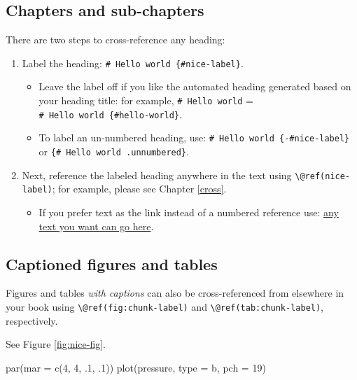 \documentclass[
]{book}
\newenvironment{Shaded}{\begin{snugshade}}{\end{snugshade}}
\newcommand{\AttributeTok}[1]{\textcolor[rgb]{0.77,0.63,0.00}{#1}}
\newcommand{\DecValTok}[1]{\textcolor[rgb]{0.00,0.00,0.81}{#1}}
\newcommand{\FunctionTok}[1]{\textcolor[rgb]{0.00,0.00,0.00}{#1}}
\newcommand{\NormalTok}[1]{#1}
\newcommand{\StringTok}[1]{\textcolor[rgb]{0.31,0.60,0.02}{#1}}
\providecommand{\tightlist}{%
  \setlength{\itemsep}{0pt}\setlength{\parskip}{0pt}}
\theoremstyle{definition}
\theoremstyle{definition}
\theoremstyle{definition}
\theoremstyle{definition}
\theoremstyle{remark}
\begin{document}
\hypertarget{chapters-and-sub-chapters}{%
\subsection{Chapters and sub-chapters}\label{chapters-and-sub-chapters}}

There are two steps to cross-reference any heading:

\begin{enumerate}
\def\labelenumi{\arabic{enumi}.}
\tightlist
\item
  Label the heading: \texttt{\#\ Hello\ world\ \{\#nice-label\}}.

  \begin{itemize}
  \tightlist
  \item
    Leave the label off if you like the automated heading generated based on your heading title: for example, \texttt{\#\ Hello\ world} = \texttt{\#\ Hello\ world\ \{\#hello-world\}}.
  \item
    To label an un-numbered heading, use: \texttt{\#\ Hello\ world\ \{-\#nice-label\}} or \texttt{\{\#\ Hello\ world\ .unnumbered\}}.
  \end{itemize}
\item
  Next, reference the labeled heading anywhere in the text using \texttt{\textbackslash{}@ref(nice-label)}; for example, please see Chapter \ref{cross}.

  \begin{itemize}
  \tightlist
  \item
    If you prefer text as the link instead of a numbered reference use: \protect\hyperlink{cross}{any text you want can go here}.
  \end{itemize}
\end{enumerate}

\hypertarget{captioned-figures-and-tables}{%
\subsection{Captioned figures and tables}\label{captioned-figures-and-tables}}

Figures and tables \emph{with captions} can also be cross-referenced from elsewhere in your book using \texttt{\textbackslash{}@ref(fig:chunk-label)} and \texttt{\textbackslash{}@ref(tab:chunk-label)}, respectively.

See Figure \ref{fig:nice-fig}.

\begin{Shaded}
\begin{Highlighting}[]
\FunctionTok{par}\NormalTok{(}\AttributeTok{mar =} \FunctionTok{c}\NormalTok{(}\DecValTok{4}\NormalTok{, }\DecValTok{4}\NormalTok{, .}\DecValTok{1}\NormalTok{, .}\DecValTok{1}\NormalTok{))}
\FunctionTok{plot}\NormalTok{(pressure, }\AttributeTok{type =} \StringTok{\textquotesingle{}b\textquotesingle{}}\NormalTok{, }\AttributeTok{pch =} \DecValTok{19}\NormalTok{)}
\end{Highlighting}
\end{Shaded}
\end{document}

